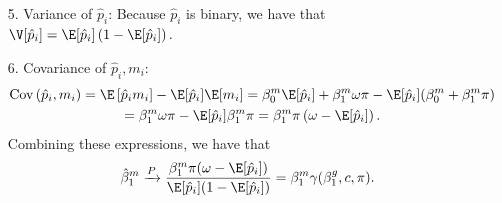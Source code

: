 \documentclass[11pt]{article}
\begin{document}
\begin{appendices}
\begin{refsection}
\begin{itemize}
\begin{multline*}
\end{multline*}
\item[5.] Variance of $\hat{p}_i$: Because $\hat{p}_i$ is binary, we have that $\V[\hat{p}_i] = \E[\hat{p}_i]\left(1 - \E[\hat{p}_i]\right) .$
\item[6.] Covariance of $\hat{p}_i, m_i$:
\begin{multline*}
\textrm{Cov}\left(\hat{p}_i, m_i\right) = \E\left[\hat{p}_i m_i\right] - \E[\hat{p}_i] \E[m_i] = \beta^m_0 \E[\hat{p}_i] + \beta^m_1 \omega \pi - \E[\hat{p}_i]( \beta^m_0 + \beta^m_1 \pi)\\ = \beta^m_1 \omega \pi - \E[\hat{p}_i] \beta_1^m \pi = \beta^m_1 \pi \left( \omega - \E[\hat{p}_i]\right).
\end{multline*}
Combining these expressions, we have that
$$ \hat{\beta}^m_1 \xrightarrow{P} \frac{\beta^m_1 \pi (\omega - \E[\hat{p}_i])}{\E[\hat{p}_i](1 - \E[\hat{p}_i])} = \beta^m_1 \gamma(\beta^g_1, c, \pi).$$
\end{itemize}


\end{refsection}
\end{appendices}
\end{document}
